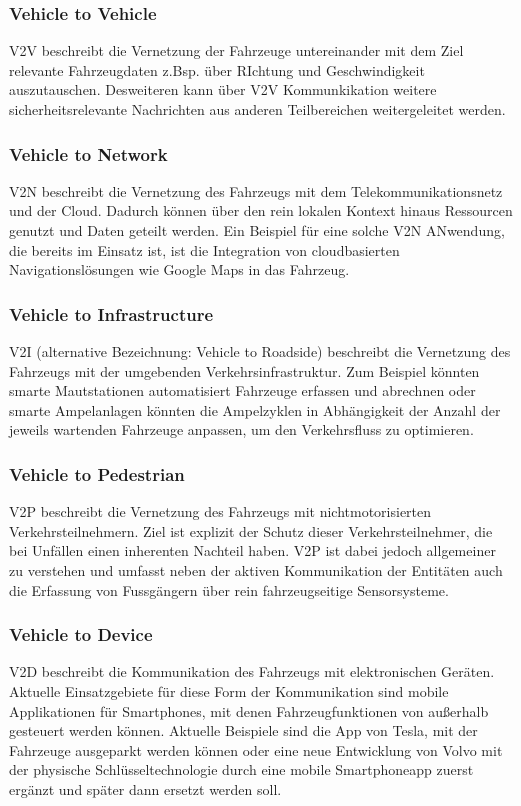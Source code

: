    \subsubsection{Vehicle to Vehicle}
    V2V beschreibt die Vernetzung der Fahrzeuge untereinander mit dem Ziel relevante Fahrzeugdaten z.Bsp. über RIchtung und Geschwindigkeit auszutauschen.
    Desweiteren kann über V2V Kommunkikation weitere sicherheitsrelevante Nachrichten aus anderen Teilbereichen weitergeleitet werden.

    \subsubsection{Vehicle to Network}
    V2N beschreibt die Vernetzung des Fahrzeugs mit dem Telekommunikationsnetz und der Cloud. Dadurch können über den
    rein lokalen Kontext hinaus Ressourcen genutzt und Daten geteilt werden. Ein Beispiel für eine solche V2N ANwendung, die bereits
    im Einsatz ist, ist die Integration von cloudbasierten Navigationslösungen wie Google Maps in das Fahrzeug.
    
    \subsubsection{Vehicle to Infrastructure}
    V2I (alternative Bezeichnung: Vehicle to Roadside) beschreibt die Vernetzung des Fahrzeugs mit der umgebenden Verkehrsinfrastruktur. Zum Beispiel könnten smarte
    Mautstationen automatisiert Fahrzeuge erfassen und abrechnen oder smarte Ampelanlagen könnten die Ampelzyklen in Abhängigkeit
    der Anzahl der jeweils wartenden Fahrzeuge anpassen, um den Verkehrsfluss zu optimieren. 

    \subsubsection{Vehicle to Pedestrian}
    V2P beschreibt die Vernetzung des Fahrzeugs mit nichtmotorisierten Verkehrsteilnehmern. Ziel ist explizit der
    Schutz dieser Verkehrsteilnehmer, die bei Unfällen einen inherenten Nachteil haben. V2P ist dabei jedoch allgemeiner
    zu verstehen und umfasst neben der aktiven Kommunikation der Entitäten auch die Erfassung von Fussgängern über rein
    fahrzeugseitige Sensorsysteme.

    \subsubsection{Vehicle to Device}
    V2D beschreibt die Kommunikation des Fahrzeugs mit elektronischen Geräten. Aktuelle Einsatzgebiete für diese Form der Kommunikation
    sind mobile Applikationen für Smartphones, mit denen Fahrzeugfunktionen von außerhalb gesteuert werden können. Aktuelle Beispiele
    sind die App von Tesla, mit der Fahrzeuge ausgeparkt werden können oder eine neue Entwicklung von Volvo mit der physische Schlüsseltechnologie
    durch eine mobile Smartphoneapp zuerst ergänzt und später dann ersetzt werden soll. ~\cite{BP05}
     

